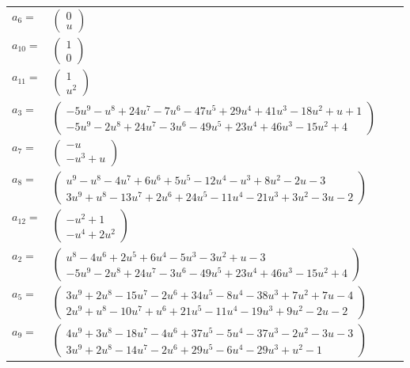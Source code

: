 \documentclass[1p]{elsarticle_modified}
\theoremstyle{definition}
\begin{document}
\begin{tabular}{m{7pt} m{180pt} m{7pt} m{180pt} }
\flushright $a_{6}=$&$\begin{pmatrix}0\\u\end{pmatrix}$ \\
\flushright $a_{10}=$&$\begin{pmatrix}1\\0\end{pmatrix}$ \\
\flushright $a_{11}=$&$\begin{pmatrix}1\\u^2\end{pmatrix}$ \\
\flushright $a_{3}=$&$\begin{pmatrix}-5 u^9- u^8+24 u^7-7 u^6-47 u^5+29 u^4+41 u^3-18 u^2+u+1\\-5 u^9-2 u^8+24 u^7-3 u^6-49 u^5+23 u^4+46 u^3-15 u^2+4\end{pmatrix}$ \\
\flushright $a_{7}=$&$\begin{pmatrix}- u\\- u^3+u\end{pmatrix}$ \\
\flushright $a_{8}=$&$\begin{pmatrix}u^9- u^8-4 u^7+6 u^6+5 u^5-12 u^4- u^3+8 u^2-2 u-3\\3 u^9+u^8-13 u^7+2 u^6+24 u^5-11 u^4-21 u^3+3 u^2-3 u-2\end{pmatrix}$ \\
\flushright $a_{12}=$&$\begin{pmatrix}- u^2+1\\- u^4+2 u^2\end{pmatrix}$ \\
\flushright $a_{2}=$&$\begin{pmatrix}u^8-4 u^6+2 u^5+6 u^4-5 u^3-3 u^2+u-3\\-5 u^9-2 u^8+24 u^7-3 u^6-49 u^5+23 u^4+46 u^3-15 u^2+4\end{pmatrix}$ \\
\flushright $a_{5}=$&$\begin{pmatrix}3 u^9+2 u^8-15 u^7-2 u^6+34 u^5-8 u^4-38 u^3+7 u^2+7 u-4\\2 u^9+u^8-10 u^7+u^6+21 u^5-11 u^4-19 u^3+9 u^2-2 u-2\end{pmatrix}$ \\
\flushright $a_{9}=$&$\begin{pmatrix}4 u^9+3 u^8-18 u^7-4 u^6+37 u^5-5 u^4-37 u^3-2 u^2-3 u-3\\3 u^9+2 u^8-14 u^7-2 u^6+29 u^5-6 u^4-29 u^3+u^2-1\end{pmatrix}$ \\

\end{tabular}
\end{document}
